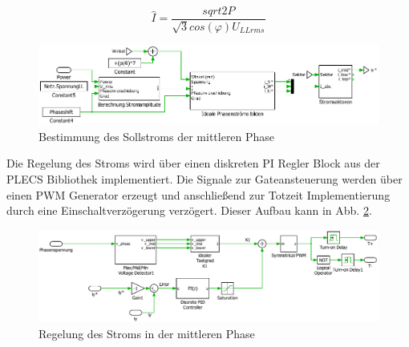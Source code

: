 		\begin{equation}
			\label{eq:Idach}
			 \hat{I} = \dfrac{sqrt{2} P   }{ \sqrt{3} cos(\varphi)   U_{LLrms} }
		\end{equation}
		
		\begin{figure}
			\centering
			\includegraphics[width=0.9\linewidth]{content/Grafiken/PlecsIAFiy}
			\caption{Bestimmung des Sollstroms der mittleren Phase}
			\label{fig:plecsiafiy}
		\end{figure}
		
		Die Regelung des Stroms wird über einen diskreten PI Regler Block aus der PLECS Bibliothek implementiert. Die Signale zur Gateansteuerung werden über einen PWM Generator erzeugt und anschließend zur Totzeit Implementierung durch eine Einschaltverzögerung verzögert. Dieser Aufbau kann in Abb. \ref{fig:plecsiafivsk1}.
		\begin{figure}
			\centering
			\includegraphics[width=1\linewidth]{content/Grafiken/PlecsIAFivsK1}
			\caption{Regelung des Stroms in der mittleren Phase}
			\label{fig:plecsiafivsk1}
		\end{figure}
		
	

